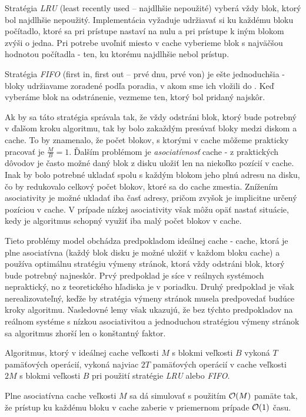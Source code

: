 Stratégia \emph{LRU} (least recently used -- najdlhšie nepoužité) vyberá vždy blok, ktorý bol najdlhšie nepoužitý. Implementácia vyžaduje udržiavať si ku každému bloku počítadlo, ktoré sa pri prístupe nastaví na nulu a pri prístupe k iným blokom zvýši o jedna. Pri potrebe uvoľniť miesto v cache vyberieme blok s najväčšou hodnotou počítadla - ten, ku ktorému najdlhšie nebol prístup.

Stratégia \emph{FIFO} (first in, first out -- prvé dnu, prvé von) je ešte jednoduchšia - bloky udržiavame zoradené podľa poradia, v akom sme ich vložili do \cache. Keď vyberáme blok na odstránenie, vezmeme ten, ktorý bol pridaný najskôr.

Ak by sa táto stratégia správala tak, že vždy odstráni blok, ktorý bude potrebný v ďalšom kroku algoritmu, tak by bolo zakaždým presúvať bloky medzi diskom a cache. To by znamenalo, že počet blokov, s ktorými v cache môžeme prakticky pracovať je $\frac{M}{B} = 1$. Ďalším problémom je \emph{asociatívnosť} cache - z praktických dôvodov je často možné daný blok z disku uložiť len na niekoľko pozícií v cache. Inak by bolo potrebné ukladať spolu s každým blokom jeho plnú adresu na disku, čo by redukovalo celkový počet blokov, ktoré sa do cache zmestia. Znížením asociativity je možné ukladať iba časť adresy, pričom zvyšok je implicitne určený pozíciou v cache. V prípade nízkej asociativity však môžu opäť nastať situácie, kedy je algoritmus schopný využiť iba malý počet blokov v cache.

Tieto problémy \obliv model obchádza predpokladom ideálnej cache - cache, ktorá je plne asociatívna (každý blok disku je možné uložiť v každom bloku cache) a používa optimálnu stratégiu výmeny stránok, ktorá vždy odstráni blok, ktorý bude potrebný najneskôr. Prvý predpoklad je síce v reálnych systémoch nepraktický, no z teoretického hľadiska je v poriadku. Druhý predpoklad je však nerealizovateľný, keďže by stratégia výmeny stránok musela predpovedať budúce kroky algoritmu. Nasledovné lemy však ukazujú, že bez týchto predpokladov na reálnom systéme s nízkou asociativitou a jednoduchou stratégiou výmeny stránok sa algoritmus zhorší len o konštantný faktor.

\begin{lema}
Algoritmus, ktorý v ideálnej cache veľkosti $M$ s blokmi veľkosti $B$ vykoná $T$ pamäťových operácií, vykoná najviac $2T$ pamäťových operácií v cache veľkosti $2M$ s blokmi veľkosti $B$ pri použití stratégie \emph{LRU} alebo \emph{FIFO}. \citep[Lemma 12]{frigo1999cache}
\end{lema}

\begin{lema}
Plne asociatívna cache veľkosti $M$ sa dá simulovať s použitím $\mathcal{O}(M)$ pamäte tak, že prístup ku každému bloku v cache zaberie v priemernom prípade $\mathcal{O}(1)$ času. \citep[Lemma 16]{frigo1999cache}
\end{lema}